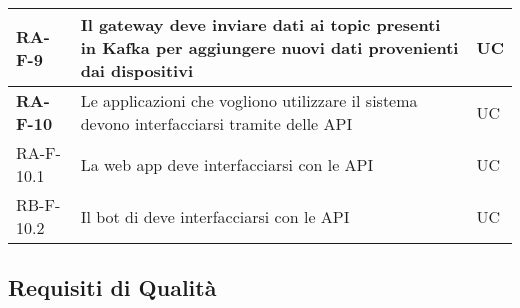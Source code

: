\begin{center}
\begin{longtable}{|p{3cm}|p{9.85cm}|p{2cm}|}
		\textbf{RA-F-9} & Il gateway deve inviare dati ai topic presenti in Kafka per aggiungere nuovi dati provenienti dai dispositivi  & UC \\ \hline

		\textbf{RA-F-10} & Le applicazioni che vogliono utilizzare il sistema devono interfacciarsi tramite delle API  & UC \\ \hline
		{\color{gray} RA-F-}10.1 & La web app deve interfacciarsi con le API & UC \\ \hline
		{\color{gray} RB-F-}10.2 & Il bot di \glock{Telegram} deve interfacciarsi con le API & UC \\ \hline
		\hline





		\end{longtable}
	\end{center}

	\subsection{Requisiti di Qualità}


